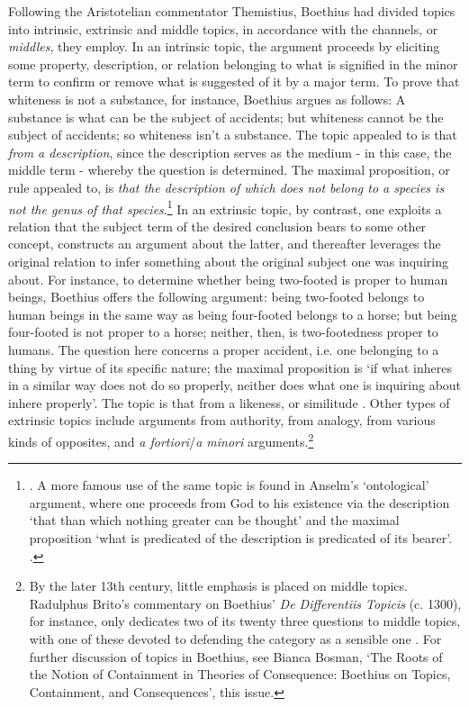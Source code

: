 \documentclass[]{article}
\begin{document}
Following the Aristotelian commentator Themistius, Boethius had divided topics into intrinsic, extrinsic and middle topics, in accordance with the channels, or \textit{middles}, they employ. In an intrinsic topic, the argument proceeds by eliciting some property, description, or relation belonging to what is signified in the minor term to confirm or remove what is suggested of it by a major term. To prove that whiteness is not a substance, for instance, Boethius argues as follows: A substance is what can be the subject of accidents; but whiteness cannot be the subject of accidents; so whiteness isn't a substance. The topic appealed to is that \textit{from a description}, since the description serves as the medium - in this case, the middle term - whereby the question is determined. The maximal proposition, or rule appealed to, is \textit{that the description of which does not belong to a species is not the genus of that species}.\footnote{\autocite[II, pp. 1187C-D]{BDT}. A more famous use of the same topic is found in Anselm's `ontological' argument, where one proceeds from God to his existence via the description `that than which nothing greater can be thought' and the maximal proposition `what is predicated of the description is predicated of its bearer'. \autocite{Holopainen2007}.} In an extrinsic topic, by contrast, one exploits a relation that the subject term of the desired conclusion bears to some other concept, constructs an argument about the latter, and thereafter leverages the original relation to infer something about the original subject one was inquiring about. For instance, to determine whether being two-footed is proper to human beings, Boethius offers the following argument: being two-footed belongs to human beings in the same way as being four-footed belongs to a horse; but being four-footed is not proper to a horse; neither, then, is two-footedness proper to humans. The question here concerns a proper accident, i.e. one belonging to a thing by virtue of its specific nature; the maximal proposition is `if what inheres in a similar way does not do so properly, neither does what one is inquiring about inhere properly'. The topic is that from a likeness, or similitude \autocite[II, pp. 1190C-D]{BDT}. Other types of extrinsic topics include arguments from authority, from analogy, from various kinds of opposites, and \textit{a fortiori}/\textit{a minori} arguments.\footnote{By the later 13th century, little emphasis is placed on middle topics. Radulphus Brito's commentary on Boethius' \textit{De Differentiis Topicis} (c. 1300), for instance, only dedicates two of its twenty three questions to middle topics, with one of these devoted to defending the category as a sensible one \autocite[II, qq. 22-23, pp. 78-84]{BritoDDT}. For further discussion of topics in Boethius, see Bianca Bosman, `The Roots of the Notion of Containment in Theories of Consequence: Boethius on Topics, Containment, and Consequences', this issue.}
\end{document}
